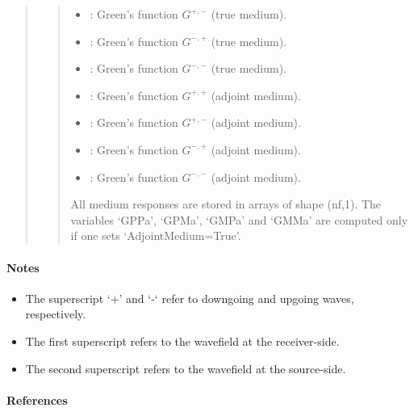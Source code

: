 \documentclass[letterpaper,10pt,english]{sphinxmanual}
\begin{document}
\begin{fulllineitems}
\begin{fulllineitems}
\begin{quote}
\begin{description}
\begin{quote}
\begin{description}
\begin{itemize}
\item {} 
: Green’s function \(G^{+,-}\) (true medium).

\item {} 
: Green’s function \(G^{-,+}\) (true medium).

\item {} 
: Green’s function \(G^{-,-}\) (true medium).

\item {} 
: Green’s function \(G^{+,+}\) (adjoint medium).

\item {} 
: Green’s function \(G^{+,-}\) (adjoint medium).

\item {} 
: Green’s function \(G^{-,+}\) (adjoint medium).

\item {} 
: Green’s function \(G^{-,-}\) (adjoint medium).

\end{itemize}

\end{description}

All medium responses are stored in arrays of shape (nf,1). The variables ‘GPPa’, ‘GPMa’, ‘GMPa’ and ‘GMMa’ are computed only if one sets ‘AdjointMedium=True’.
\end{quote}

\end{description}\end{quote}
\paragraph{Notes}
\begin{itemize}
\item {} 
The superscript ‘+’ and ‘-‘ refer to downgoing and upgoing waves, respectively.

\item {} 
The first superscript refers to the wavefield at the receiver-side.

\item {} 
The second superscript refers to the wavefield at the source-side.

\end{itemize}
\paragraph{References}


\end{fulllineitems}
\end{fulllineitems}
\end{document}
